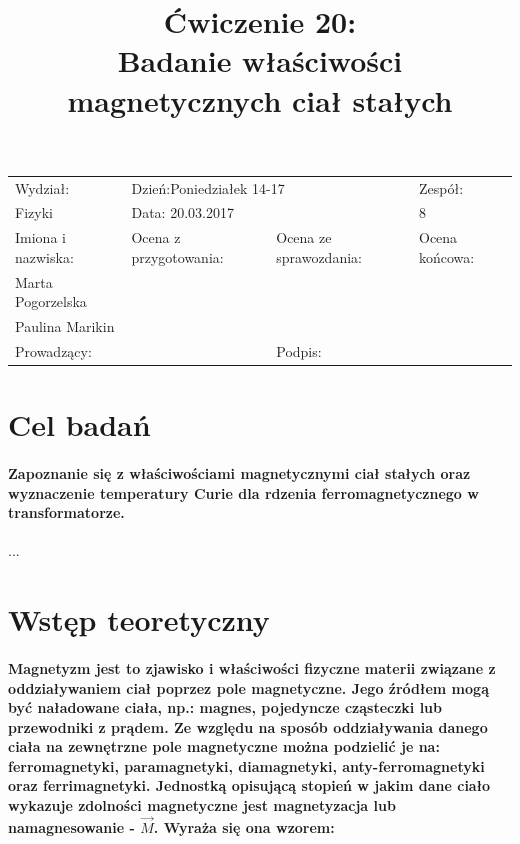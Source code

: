\documentclass[a4paper,10pt]{article}
\def\arraystretch{1.2}
\begin{document}
\begin{table}
  \centering
  \def\arraystretch{1.5}
    \begin{tabular}{|l|l|l|l|} \hline
    Wydział:           & \multicolumn{2}{l|}{Dzień:Poniedziałek 14-17}    &Zespół:  \\
    Fizyki             &    \multicolumn{2}{l|}{Data: 20.03.2017}         &8             \\\hline
    Imiona i nazwiska: &Ocena z przygotowania:  &Ocena ze sprawozdania:   &Ocena końcowa: \\
    Marta Pogorzelska  &                        &                         &                \\
    Paulina Marikin    &                        &                         &\\\hline
    \multicolumn{2}{|l|}{Prowadzący:                 } &\multicolumn{2}{l|}{Podpis:             }  \\\hline
  \end{tabular}
\end{table}

\title{Ćwiczenie 20:\\Badanie właściwości magnetycznych ciał stałych}
\date{}
\maketitle{}

\section{Cel badań}
\paragraph{Zapoznanie się z właściwościami magnetycznymi ciał stałych oraz wyznaczenie temperatury Curie dla rdzenia ferromagnetycznego w transformatorze.}...

\section{Wstęp teoretyczny}
\paragraph{Magnetyzm jest to zjawisko i właściwości fizyczne materii związane z oddziaływaniem ciał poprzez pole magnetyczne. Jego źródłem mogą być naładowane ciała, np.: magnes, pojedyncze cząsteczki lub przewodniki z prądem. Ze względu na sposób oddziaływania danego ciała na zewnętrzne pole magnetyczne można podzielić je na: ferromagnetyki, paramagnetyki, diamagnetyki, anty-ferromagnetyki oraz ferrimagnetyki. Jednostką opisującą stopień w jakim dane ciało wykazuje zdolności magnetyczne jest magnetyzacja lub namagnesowanie - $\vec{M}$. Wyraża się ona wzorem:}
\end{document}
